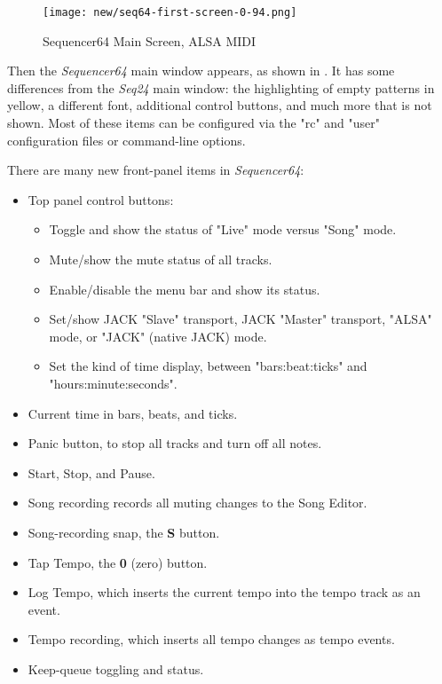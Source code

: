 \documentclass[
 11pt,
 twoside,
 a4paper,
 headinclude,
 footinclude,
 final                                 %
]{article}
\begin{document}
\begin{figure}[H]
   \centering 
   \texttt{[image: new/seq64-first-screen-0-94.png]}
   \caption{Sequencer64 Main Screen, ALSA MIDI}
   \label{fig:seq64_main_screen}
\end{figure}

   Then the \textsl{Sequencer64} main window appears, as shown in
   .  It has some differences
   from the \textsl{Seq24} main window: the highlighting of
   empty patterns in yellow, a different font, additional control buttons,
   and much more that is not shown.
   Most of these items can be configured via the "rc" and "user" configuration
   files or command-line options.

   There are many new front-panel items in \textsl{Sequencer64}:

   \begin{itemize}
      \item Top panel control buttons:
      \begin{itemize}
         \item Toggle and show the status of "Live" mode versus "Song" mode.
         \item Mute/show the mute status of all tracks.
         \item Enable/disable the menu bar and show its status.
         \item Set/show JACK "Slave" transport, JACK "Master" transport,
            "ALSA" mode, or "JACK" (native JACK) mode.
         \item Set the kind of time display, between "bars:beat:ticks"
            and "hours:minute:seconds".
      \end{itemize}
      \item Current time in bars, beats, and ticks.
      \item Panic button, to stop all tracks and turn off all notes.
      \item Start, Stop, and Pause.
      \item Song recording records all muting changes to the Song Editor.
      \item Song-recording snap, the \textbf{S} button.
      \item Tap Tempo, the \textbf{0} (zero) button.
      \item Log Tempo, which inserts the current tempo into the tempo track
         as an event.
      \item Tempo recording, which inserts all tempo changes as tempo events.
      \item Keep-queue toggling and status.
   \end{itemize}
\end{document}
